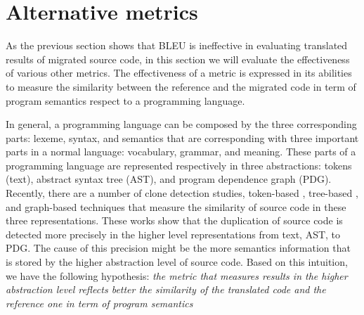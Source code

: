 \section{Alternative metrics}
\label{sec:alternatives}
%
As the previous section shows that BLEU is ineffective in evaluating
translated results of migrated source code, in this section we will 
evaluate the effectiveness of various other metrics. The effectiveness of
a metric is expressed in its abilities to measure the similarity between
the reference and the migrated code in term of program semantics respect to 
a programming language.

In general, a programming language can be composed by the three corresponding parts: 
lexeme, syntax, and semantics that are corresponding with three important 
parts in a normal language: vocabulary, grammar, and meaning.
These parts of a programming language are represented respectively in three 
abstractions: tokens (text), abstract syntax tree (AST), and program 
dependence graph (PDG).
%
Recently, there are a number of clone detection studies, token-based 
\cite{thay}, tree-based \cite{thay}, and graph-based \cite{thay} techniques 
that measure the similarity of source code in these three representations.
These works show that the duplication of source code is detected more 
precisely in the higher level representations from text, AST, to PDG.
The cause of this precision might be the more semantics information that
is stored by the higher abstraction level of source code. Based on this 
intuition, we have the following hypothesis: \textit{the metric that 
measures results in the higher abstraction level reflects better the 
similarity of the translated code and the reference one in term of 
program semantics}

